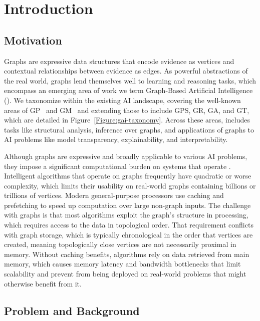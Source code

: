 
\renewcommand{\thechapter}{1}
\chapter{Introduction}
\label{chapter:10-Introduction}

\section{Motivation}
Graphs are expressive data structures that encode evidence as vertices and contextual relationships between evidence as edges. 
As powerful abstractions of the real world, graphs lend themselves well to learning and reasoning tasks, which encompass an emerging area of work we term Graph-Based Artificial Intelligence (\gai).
We taxonomize \gai within the existing AI landscape, covering the well-known areas of \ac{GP}~\cite{Smith2021, Zhou2020a, Xia2021} and \ac{GM}~\cite{Chen2022a} and extending those to include \ac{GPS}, \ac{GR}, \ac{GA}, and \ac{GT}, which are detailed in Figure~\ref{Figure:gai-taxonomy}.
Across these areas, \gai includes tasks like structural analysis, inference over graphs, and applications of graphs to AI problems like model transparency, explainability, and interpretability.



Although graphs are expressive and broadly applicable to various AI problems, they impose a significant computational burden on systems that operate \gai.
Intelligent algorithms that operate on graphs frequently have quadratic or worse complexity, which limits their usability on real-world graphs containing billions or trillions of vertices. 
Modern general-purpose processors use caching and prefetching to speed up computation over large non-graph inputs.
The challenge with graphs is that most \gai algorithms exploit the graph's structure in processing, which requires access to the data in topological order.
That requirement conflicts with graph storage, which is typically chronological in the order that vertices are created, meaning topologically close vertices are not necessarily proximal in memory. 
Without caching benefits, \gai algorithms rely on data retrieved from main memory, which causes memory latency and bandwidth bottlenecks that limit scalability and prevent \gai from being deployed on real-world problems that might otherwise benefit from it. 

\section{Problem and Background}
\label{section:11-introduction-to-problem}


